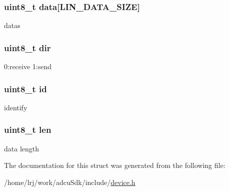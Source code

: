 \subsubsection[{\texorpdfstring{data}{data}}]{\setlength{\rightskip}{0pt plus 5cm}uint8\+\_\+t data\mbox{[}{\bf L\+I\+N\+\_\+\+D\+A\+T\+A\+\_\+\+S\+I\+ZE}\mbox{]}}\hypertarget{structp__adcuLinData_a87a96d212d536666bdd947f932f22fb1}{}\label{structp__adcuLinData_a87a96d212d536666bdd947f932f22fb1}
datas 
\subsubsection[{\texorpdfstring{dir}{dir}}]{\setlength{\rightskip}{0pt plus 5cm}uint8\+\_\+t dir}\hypertarget{structp__adcuLinData_a92abda0bec7c1c978fe96f87aad18067}{}\label{structp__adcuLinData_a92abda0bec7c1c978fe96f87aad18067}
0\+:receive 1\+:send 
\subsubsection[{\texorpdfstring{id}{id}}]{\setlength{\rightskip}{0pt plus 5cm}uint8\+\_\+t id}\hypertarget{structp__adcuLinData_a1e6927fa1486224044e568f9c370519b}{}\label{structp__adcuLinData_a1e6927fa1486224044e568f9c370519b}
identify 
\subsubsection[{\texorpdfstring{len}{len}}]{\setlength{\rightskip}{0pt plus 5cm}uint8\+\_\+t len}\hypertarget{structp__adcuLinData_a5723e60ffd628510c699eddbce90be23}{}\label{structp__adcuLinData_a5723e60ffd628510c699eddbce90be23}
data length 

The documentation for this struct was generated from the following file\+:\begin{DoxyCompactItemize}
\item 
/home/lrj/work/adcu\+Sdk/include/\hyperlink{device_8h}{device.\+h}\end{DoxyCompactItemize}
